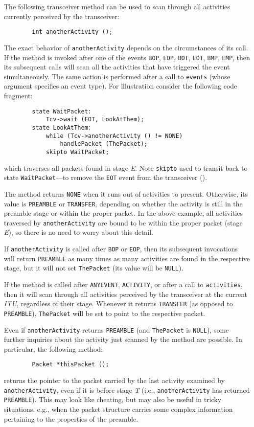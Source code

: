 The following transceiver method can be used to scan through all activities
currently perceived by the transceiver:
\begin{verbatim}
        int anotherActivity ();
\end{verbatim}
\noindent
The exact behavior of {\tt anotherActivity} depends on the circumstances of
its call.
If the method is invoked after one of the events {\tt BOP}, {\tt EOP},
{\tt BOT}, {\tt EOT}, {\tt BMP}, {\tt EMP},
then its subsequent calls will scan all the activities that have
triggered the event simultaneously.
The same action is performed after a call to {\tt events} (whose argument
specifies an event type).
For illustration consider the following code fragment:
\begin{verbatim}
        state WaitPacket:
            Tcv->wait (EOT, LookAtThem);
        state LookAtThem:
            while (Tcv->anotherActivity () != NONE)
                handlePacket (ThePacket);
            skipto WaitPacket;
\end{verbatim}
\noindent
which traverses all packets found in stage {\em E}.
Note {\tt skipto} used to transit back to state {\tt WaitPacket}---to 
remove the {\tt EOT} event from the transceiver ().

The method returns {\tt NONE} when it runs out of activities to present.
Otherwise, its value is
{\tt PREAMBLE} or {\tt TRANSFER}, depending on whether the activity is still
in the preamble stage or within the proper packet.
In the above example, all activities traversed by {\tt anotherActivity} are
bound to be within the proper packet (stage {\em E\/}), so there is no
need to worry about this detail.

If {\tt anotherActivity} is called after {\tt BOP} or {\tt EOP},
then its subsequent invocations
will return {\tt PREAMBLE} as many times as many activities are found in the
respective stage, but it will not set {\tt ThePacket} (its value will be
{\tt NULL}).

If the method is called after {\tt ANYEVENT}, {\tt ACTIVITY}, or after
a call to {\tt activities}, then it will scan through
all activities perceived by the transceiver at the current {\em ITU},
regardless of their stage.
Whenever it returns {\tt TRANSFER} (as opposed to {\tt PREAMBLE}),
{\tt ThePacket} will be set to point to the respective packet.

Even if {\tt anotherActivity} returns {\tt PREAMBLE} (and
{\tt ThePacket} is {\tt NULL}),
some further inquiries about the activity just scanned by the
method are possible.
In particular, the following method:
\begin{verbatim}
        Packet *thisPacket ();
\end{verbatim}
\noindent
returns the pointer to the packet carried by the last activity examined
by {\tt anotherActivity}, even if it is before stage {\em T\/} (i.e.,
{\tt anotherActivity} has returned {\tt PREAMBLE}).
This may look like cheating, but may also be useful in tricky situations,
e.g., when the
packet structure carries some complex information pertaining to the properties
of the preamble.

